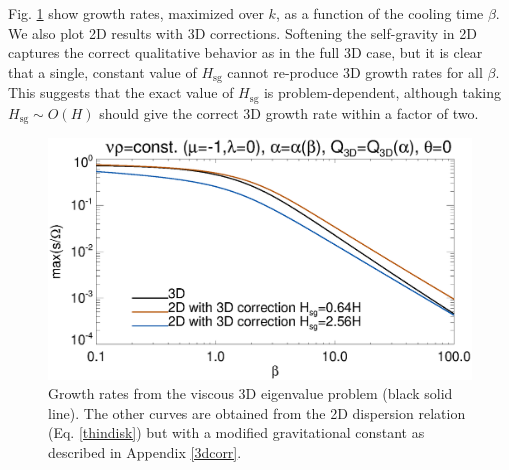 Fig. \ref{3d_visc} show growth rates, maximized over $k$, as a
function of the cooling time $\beta$. We also plot 2D results with 3D
corrections. Softening the self-gravity in 2D captures the correct 
qualitative behavior as in the full 3D case, but it is clear that a
single, constant value of $H_\mathrm{sg}$ cannot re-produce 3D growth 
rates for all $\beta$. 
This suggests that the exact value of
$H_\mathrm{sg}$ is problem-dependent, although taking
$H_\mathrm{sg}\sim O(H)$ should give the correct 3D growth rate within
a factor of two. 


 

\begin{figure}
  \includegraphics[width=\linewidth,clip=true,trim=0cm 0.cm 0.23cm
    0.0cm]{figures/growth_visc3d}
  \caption{Growth rates from the viscous 3D eigenvalue problem (black solid
    line). The other curves are obtained from the 2D dispersion
    relation (Eq. \ref{thindisk}) but with a modified gravitational
    constant as described in Appendix \ref{3dcorr}. \label{3d_visc}}
\end{figure}

